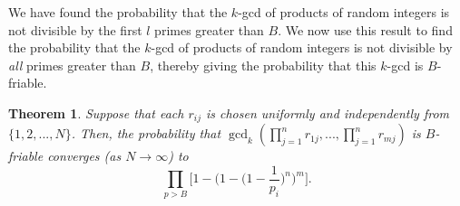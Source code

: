 \documentclass[12pt]{amsart}
\newtheorem{theorem}{Theorem}[subsection]
\theoremstyle{definition}
\begin{document}
We have found the probability that the $k$-gcd of products of random integers is not divisible by the first \(l\) primes greater than \(B\). We now use this result to find the probability that the $k$-gcd of products of random integers is not divisible by \textit{all} primes greater than $B$, thereby giving the probability that this $k$-gcd is $B$-friable.

\begin{theorem} Suppose that each $r_{ij}$ is chosen uniformly and independently from $\{1, 2, ..., N\}$. Then, the probability that $\gcd_k(\prod_{j=1}^n r_{1j}, ... , \prod_{j=1}^n r_{mj})$ is $B$-friable converges (as $N \to \infty$) to
	$$\prod_{p>B} \Big[1 - \Big(1 - \Big(1-\frac{1}{p_i}\Big)^n\Big)^m\Big].$$
\end{theorem}

\end{document}
